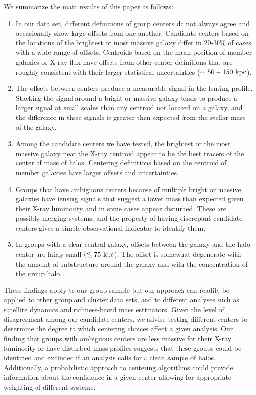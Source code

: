 We summarize the main results of this paper as follows:
\begin{enumerate}
\item In our data set, different definitions of group centers do not
  always agree and occasionally show large offsets from one another. Candidate centers
  based on the locations of the brightest or most massive galaxy
  differ in 20-30\% of cases with a wide range of offsets. Centroids based on the
  mean position of member galaxies or X-ray flux have offsets
  from other center definitions that are roughly
  consistent with their larger statistical uncertainties ($\sim50-150~{\rm kpc}$).
\item The offsets between centers produce a measurable signal in the
  lensing profile. Stacking the signal around a bright or massive
  galaxy tends to produce a larger signal at small scales than any
  centroid not located on a galaxy, and the difference in
  these signals is greater than expected from the stellar mass of the galaxy.
\item Among the candidate centers we have tested, the brightest or the
  most massive galaxy near the X-ray centroid appear to be the best
  tracers of the center of mass of halos. Centering definitions based
  on the centroid of member galaxies have larger offsets and uncertainties.
\item Groups that have ambiguous centers because of multiple bright or
  massive galaxies have lensing signals that suggest a lower mass than expected given their X-ray
  luminosity and in some cases appear
    disturbed. These are possibly merging systems, and the property
  of having discrepant candidate centers gives a simple observational
  indicator to identify them.
\item In groups with a clear central galaxy, offsets between the
  galaxy and the halo center are fairly small ($\lesssim 75~{\rm
    kpc}$).  The offset is somewhat degenerate with the amount of
  substructure around the galaxy and with the concentration of the
  group halo.
\end{enumerate}

These findings apply to our group sample but our approach can readily
be applied to other group and cluster data sets, and to different
analyses such as satellite dynamics and richness-based mass
estimators. Given the level of disagreement among our candidate
centers, we advise testing different centers to determine the degree
to which centering choices affect a given analysis. Our finding that groups
with ambiguous centers are less massive for their
  X-ray luminosity or have disturbed mass profiles suggests that
these groups could be identified and excluded if an analysis calls for
a clean sample of halos. Additionally, a probabilistic approach to 
centering algorithms could provide information about the confidence in
a given center allowing for appropriate weighting of different systems.

